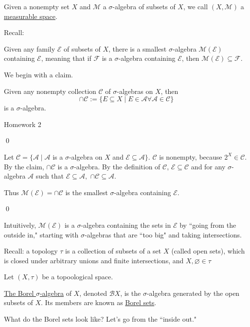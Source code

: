 \documentclass[x11names,reqno,14pt]{extarticle}
\begin{document}
Given a nonempty set $X$ and $\mathcal{M}$ a $\sigma$-algebra of subsets of $X$, we call $(X, \mathcal{M})$ a \underline{measurable space}.

Recall: 

\prop

Given any family $\mathcal{E}$ of subsets of $X$, there is a smallest $\sigma$-algebra $\mathcal{M}(\mathcal{E})$ containing $\mathcal{E}$, meaning that if $\mathcal{F}$ is a $\sigma$-algebra containing $\mathcal{E}$, then $\mathcal{M}(\mathcal{E}) \subseteq \mathcal{F}$. 

\proof

We begin with a claim. 

\claim Given any nonempty collection $\mathcal{C}$ of $\sigma$-algebras on $X$, then 
\[
\cap \mathcal{C} := \{E \subseteq X \mid E \in \mathcal{A} \forall \mathcal{A} \in \mathcal{C}\}
\]
is a $\sigma$-algebra. 

\proof Homework 2

\qed

Let $\mathcal{C} = \{\mathcal{A} \mid \mathcal{A}$ is a $\sigma$-algebra on $X$ and $\mathcal{E} \subseteq \mathcal{A}\}$. $\mathcal{C}$ is nonempty, because $2^X \in \mathcal{C}$. By the claim, $\cap\mathcal{C}$ is a $\sigma$-algebra. By the definition of $\mathcal{C}$, $\mathcal{E}\subseteq\mathcal{C}$ and for any $\sigma$-algebra $\mathcal{A}$ such that $\mathcal{E} \subseteq \mathcal{A},$ $\cap\mathcal{C} \subseteq \mathcal{A}$.

Thus $\mathcal{M}(\mathcal{E}) = \cap\mathcal{C}$ is the smallest $\sigma$-algebra containing $\mathcal{E}$.

\qed 

\rem Intuitively, $\mathcal{M}(\mathcal{E})$ is a $\sigma$-algebra containing the sets in $\mathcal{E}$ by ``going from the outside in," starting with $\sigma$-algebras that are ``too big" and taking intersections. 

Recall: a topology $\tau$ is a collection of subsets of a set $X$ (called open sets), which is closed under arbitrary unions and finite intersections, and $X, \varnothing \in \tau$

Let $(X, \tau)$ be a topoological space. 

 \underline{The Borel $\sigma$-algebra} of $X$, denoted $\mathcal{B}X$, is the $\sigma$-algebra generated by the open subsets of $X$. Its members are known as \underline{Borel sets}. 

What do the Borel sets look like? Let's go from the ``inside out." 
\end{document}

